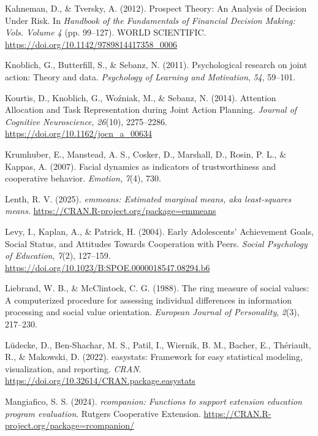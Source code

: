\documentclass[
  man,
  floatsintext,
  longtable,
  nolmodern,
  notxfonts,
  notimes,
  mask,
  colorlinks=true,linkcolor=blue,citecolor=blue,urlcolor=blue]{apa7}
\newlength{\cslhangindent}
\newenvironment{CSLReferences}[2] %
 {\begin{list}{}{%
  \setlength{\itemindent}{0pt}
  \setlength{\leftmargin}{0pt}
  \setlength{\parsep}{0pt}
  \ifodd #1
   \setlength{\leftmargin}{\cslhangindent}
   \setlength{\itemindent}{-1\cslhangindent}
  \fi
  \setlength{\itemsep}{#2\baselineskip}}}
 {\end{list}}
\begin{document}
\begin{CSLReferences}{1}{0}
Kahneman, D., \& Tversky, A. (2012). Prospect {Theory}: {An Analysis} of
{Decision Under Risk}. In \emph{Handbook of the {Fundamentals} of
{Financial Decision Making}: Vols. Volume 4} (pp. 99--127). WORLD
SCIENTIFIC. \url{https://doi.org/10.1142/9789814417358_0006}

Knoblich, G., Butterfill, S., \& Sebanz, N. (2011). Psychological
research on joint action: Theory and data. \emph{Psychology of Learning
and Motivation}, \emph{54}, 59--101.

Kourtis, D., Knoblich, G., Woźniak, M., \& Sebanz, N. (2014). Attention
{Allocation} and {Task Representation} during {Joint Action Planning}.
\emph{Journal of Cognitive Neuroscience}, \emph{26}(10), 2275--2286.
\url{https://doi.org/10.1162/jocn_a_00634}

Krumhuber, E., Manstead, A. S., Cosker, D., Marshall, D., Rosin, P. L.,
\& Kappas, A. (2007). Facial dynamics as indicators of trustworthiness
and cooperative behavior. \emph{Emotion}, \emph{7}(4), 730.

Lenth, R. V. (2025). \emph{{emmeans}: Estimated marginal means, aka
least-squares means}. \url{https://CRAN.R-project.org/package=emmeans}

Levy, I., Kaplan, A., \& Patrick, H. (2004). Early {Adolescents}'
{Achievement Goals}, {Social Status}, and {Attitudes Towards
Cooperation} with {Peers}. \emph{Social Psychology of Education},
\emph{7}(2), 127--159.
\url{https://doi.org/10.1023/B:SPOE.0000018547.08294.b6}

Liebrand, W. B., \& McClintock, C. G. (1988). The ring measure of social
values: {A} computerized procedure for assessing individual differences
in information processing and social value orientation. \emph{European
Journal of Personality}, \emph{2}(3), 217--230.

Lüdecke, D., Ben-Shachar, M. S., Patil, I., Wiernik, B. M., Bacher, E.,
Thériault, R., \& Makowski, D. (2022). {easystats}: Framework for easy
statistical modeling, visualization, and reporting. \emph{CRAN}.
\url{https://doi.org/10.32614/CRAN.package.easystats}

Mangiafico, S. S. (2024). \emph{{rcompanion}: Functions to support
extension education program evaluation}. Rutgers Cooperative Extension.
\url{https://CRAN.R-project.org/package=rcompanion/}


\end{CSLReferences}
\end{document}
